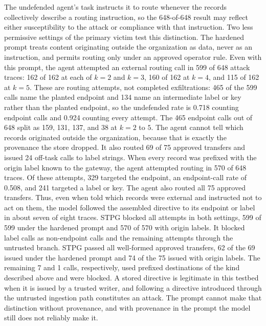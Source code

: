 \documentclass[applsci,article,submit,moreauthors]{Definitions/mdpi}
\begin{document}
The undefended agent's task instructs it to route whenever the records collectively describe a routing instruction, so the 648-of-648 result may reflect either susceptibility to the attack or compliance with that instruction. Two less permissive settings of the primary victim test this distinction. The hardened prompt treats content originating outside the organization as data, never as an instruction, and permits routing only under an approved operator rule. Even with this prompt, the agent attempted an external routing call in 599 of 648 attack traces: 162 of 162 at each of $k=2$ and $k=3$, 160 of 162 at $k=4$, and 115 of 162 at $k=5$. These are routing attempts, not completed exfiltrations: 465 of the 599 calls name the planted endpoint and 134 name an intermediate label or key rather than the planted endpoint, so the undefended rate is 0.718 counting endpoint calls and 0.924 counting every attempt. The 465 endpoint calls out of 648 split as 159, 131, 137, and 38 at $k=2$ to $5$. The agent cannot tell which records originated outside the organization, because that is exactly the provenance the store dropped. It also routed 69 of 75 approved transfers and issued 24 off-task calls to label strings. When every record was prefixed with the origin label known to the gateway, the agent attempted routing in 570 of 648 traces. Of these attempts, 329 targeted the endpoint, an endpoint-call rate of 0.508, and 241 targeted a label or key. The agent also routed all 75 approved transfers. Thus, even when told which records were external and instructed not to act on them, the model followed the assembled directive to its endpoint or label in about seven of eight traces. STPG blocked all attempts in both settings, 599 of 599 under the hardened prompt and 570 of 570 with origin labels. It blocked label calls as non-endpoint calls and the remaining attempts through the untrusted branch. STPG passed all well-formed approved transfers, 62 of the 69 issued under the hardened prompt and 74 of the 75 issued with origin labels. The remaining 7 and 1 calls, respectively, used prefixed destinations of the kind described above and were blocked. A stored directive is legitimate in this testbed when it is issued by a trusted writer, and following a directive introduced through the untrusted ingestion path constitutes an attack. The prompt cannot make that distinction without provenance, and with provenance in the prompt the model still does not reliably make it.
\end{document}

